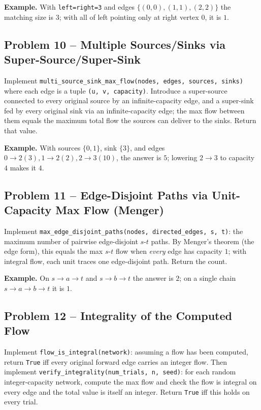 \documentclass[11pt]{article}
\begin{document}
\textbf{Example.} With \texttt{left=right=3} and edges $\{(0,0),(1,1),(2,2)\}$ the matching
size is $3$; with all of left pointing only at right vertex $0$, it is $1$.

\subsection*{Problem 10 -- Multiple Sources/Sinks via Super-Source/Super-Sink}

Implement \texttt{multi\_source\_sink\_max\_flow(nodes, edges, sources, sinks)} where each
edge is a tuple \texttt{(u, v, capacity)}. Introduce a super-source connected to every
original source by an infinite-capacity edge, and a super-sink fed by every original sink
via an infinite-capacity edge; the max flow between them equals the maximum total flow the
sources can deliver to the sinks. Return that value.

\textbf{Example.} With sources $\{0,1\}$, sink $\{3\}$, and edges $0\!\to\!2(3),
1\!\to\!2(2), 2\!\to\!3(10)$, the answer is $5$; lowering $2\!\to\!3$ to capacity $4$ makes
it $4$.

\subsection*{Problem 11 -- Edge-Disjoint Paths via Unit-Capacity Max Flow (Menger)}

Implement \texttt{max\_edge\_disjoint\_paths(nodes, directed\_edges, s, t)}: the maximum
number of pairwise edge-disjoint $s$-$t$ paths. By Menger's theorem (the edge form), this
equals the max $s$-$t$ flow when \emph{every} edge has capacity $1$; with integral flow,
each unit traces one edge-disjoint path. Return the count.

\textbf{Example.} On $s\!\to\!a\!\to\!t$ and $s\!\to\!b\!\to\!t$ the answer is $2$; on a
single chain $s\!\to\!a\!\to\!b\!\to\!t$ it is $1$.

\subsection*{Problem 12 -- Integrality of the Computed Flow}

Implement \texttt{flow\_is\_integral(network)}: assuming a flow has been computed, return
\texttt{True} iff every original forward edge carries an integer flow. Then implement
\texttt{verify\_integrality(num\_trials, n, seed)}: for each random integer-capacity
network, compute the max flow and check the flow is integral on every edge and the total
value is itself an integer. Return \texttt{True} iff this holds on every trial.
\end{document}
